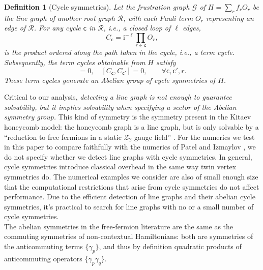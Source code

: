 \documentclass[%
 aip,
 amsmath,amssymb,
 reprint,%
]{revtex4-1}
\newtheorem{identity}{{Definition}}
\newcommand{\coeff}{f}
\begin{document}
\begin{identity}[Cycle symmetries]
Let the frustration graph $\mathcal{G}$ of $H\!=\!\sum_r \coeff_r O_r$ be the line graph of another root graph $\mathcal{R}$, with each Pauli term $O_r$ representing an edge of $\mathcal{R}$. For any cycle $\mathsf{c}$ in $\mathcal{R}$, i.e., a closed loop of $\mathcal{\ell}$ edges,
\begin{equation}
    C_{\mathsf{c}}=\mathrm{i}^{-\ell}\prod_{r\in\mathsf{c}}O_r,
\end{equation}
is the product ordered along the path taken in the cycle, i.e., a term cycle. Subsequently, the term cycles obtainable from $H$ satisfy
\begin{equation}
    [C_{\mathsf{c}},O_r]=0, \quad
    [C_{\mathsf{c}},C_{\mathsf{c}'}]=0, \qquad 
    \forall \mathsf{c},\mathsf{c}', r.
\end{equation}
These term cycles generate an Abelian group of cycle symmetries
of $H$.
\end{identity}

Critical to our analysis, {\it detecting a line graph is not enough to guarantee solvability, but it implies solvability when specifying a sector of the Abelian symmetry group.} This kind of symmetry is the symmetry present in the Kitaev honeycomb model: the honeycomb graph is a line graph, but is only solvable by a \enquote{reduction to free fermions in a static $\mathcal{Z}_2$ gauge field} \cite{Kitaev_2006}. For the numerics we test in this paper to compare faithfully with the numerics of Patel and Izmaylov \cite{patel2023extensionexactlysolvablehamiltoniansusing, patel2024exactly}, we do not specify whether we detect line graphs with cycle symmetries. In general, cycle symmetries introduce classical overhead in the same way twin vertex symmetries do. The numerical examples we consider are also of small enough size that the computational restrictions that arise from cycle symmetries do not affect performance. Due to the efficient detection of line graphs and their abelian cycle symmetries, it's practical to search for line graphs with no or a small number of cycle symmetries.  \\ %
\indent The abelian symmetries in the free-fermion literature are the same as the commuting symmetries of non-contextual Hamiltonians: both are symmetries of the anticommuting terms $\{\gamma_p\}$, and thus by definition quadratic products of anticommuting operators $\{\gamma_p \gamma_q\}$.  
\end{document}
